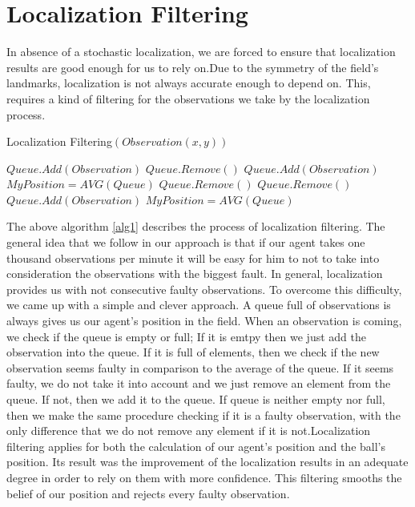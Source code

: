 \section{Localization Filtering}
In absence of a stochastic localization, we are forced to ensure that localization results are good enough for us to rely on.Due to the symmetry of the field's landmarks, localization is not always accurate enough to depend on. This, requires a kind of filtering for the observations we take by the localization process.
\begin{algorithm}[h!]
\caption{Localization Filtering$(Observation(x,y))$}
\label{alg1}
\begin{algorithmic}[1]
\STATE $Queue.Add(Observation)$
\STATE $Queue.Remove()$
\ELSE
\STATE $Queue.Add(Observation)$
\STATE $MyPosition = AVG(Queue)$
\ENDIF
\ELSE
{}
\STATE $Queue.Remove()$
\ELSE
\STATE $Queue.Remove()$
\STATE $Queue.Add(Observation)$
\STATE $MyPosition = AVG(Queue)$
\ENDIF
\ENDIF
\ENDIF
\end{algorithmic}
\end{algorithm}
The above algorithm \ref{alg1} describes the process of localization filtering. The general idea that we follow in our approach is that if our agent takes one thousand observations per minute it will be easy for him to not to take into consideration the observations with the biggest fault. In general, localization provides us with not consecutive faulty observations. To overcome this difficulty, we came up with a simple and clever approach. A queue full of observations is always gives us our agent's position in the field. When an observation is coming, we check if the queue is empty or full; If it is emtpy then we just add the observation into the queue. If it is full of elements, then we check if the new observation seems faulty in comparison to the average of the queue. If it seems faulty, we do not take it into account and we just remove an element from the queue. If not, then we add it to the queue.
If queue is neither empty nor full, then we make the same procedure checking if it is a faulty observation, with the only difference that we do not remove any element if it is not.Localization filtering applies for both the calculation of our agent's position and the ball's position. Its result was the improvement of the localization results in an adequate degree in order to rely on them with more confidence. This filtering smooths the belief of our position and rejects every faulty observation.







